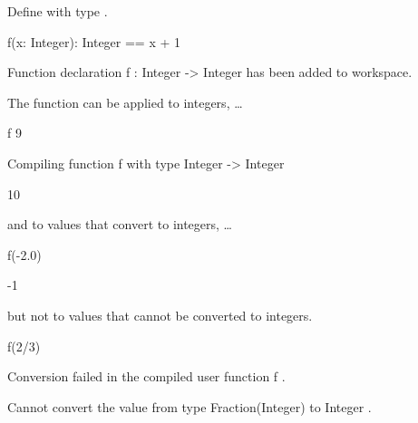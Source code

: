 \begin{xtc}
\begin{xtccomment}
Define  with type .
\end{xtccomment}
\begin{spadsrc}
f(x: Integer): Integer == x + 1 
\end{spadsrc}
\begin{MessageOutput}
   Function declaration f : Integer -> Integer has been added to 
      workspace.
\end{MessageOutput}
\end{xtc}
\begin{xtc}
\begin{xtccomment}
The function
 can be applied to integers, \ldots
\end{xtccomment}
\begin{spadsrc}
f 9 
\end{spadsrc}
\begin{MessageOutput}
   Compiling function f with type Integer -> Integer 
\end{MessageOutput}
\begin{TeXOutput}
\begin{fricasmath}{2}
10%
\end{fricasmath}
\end{TeXOutput}
\end{xtc}
\begin{xtc}
\begin{xtccomment}
and to values that convert to integers, \ldots
\end{xtccomment}
\begin{spadsrc}
f(-2.0) 
\end{spadsrc}
\begin{TeXOutput}
\begin{fricasmath}{3}
-{1}%
\end{fricasmath}
\end{TeXOutput}
\end{xtc}
\begin{xtc}
\begin{xtccomment}
but not to values that cannot be converted to integers.
\end{xtccomment}
\begin{spadsrc}
f(2/3) 
\end{spadsrc}
\begin{MessageOutput}
   Conversion failed in the compiled user function f .
\end{MessageOutput}
\begin{MessageOutput}
   Cannot convert the value from type Fraction(Integer) to Integer .
\end{MessageOutput}
\end{xtc}

